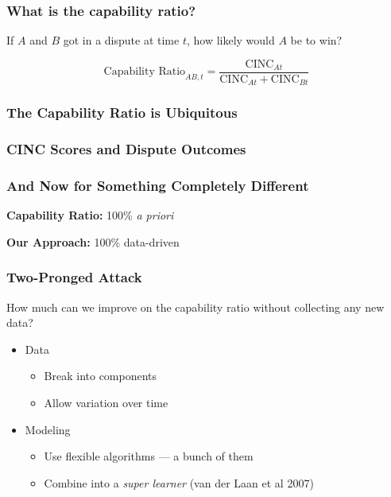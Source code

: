 \documentclass[10pt]{beamer}
\begin{document}
\begin{frame}
  \frametitle{What is the capability ratio?}

  If $A$ and $B$ got in a dispute at time $t$, how likely would $A$ be to win?

  \begin{displaymath}
    \text{Capability Ratio}_{AB,t}
    =
    \frac{\text{CINC}_{At}}{\text{CINC}_{At} + \text{CINC}_{Bt}}
  \end{displaymath}
\end{frame}

\begin{frame}
  \frametitle{The Capability Ratio is Ubiquitous}

  \scriptsize
  
\end{frame}

\begin{frame}
  \frametitle{CINC Scores and Dispute Outcomes}

  \centering
  \only<2>{}%
  \only<4>{}%
  \only<6>{}%
\end{frame}


\begin{frame}
  \frametitle{And Now for Something Completely Different}

  \textbf{Capability Ratio:} 100\% \emph{a priori}

  \textbf{Our Approach:} 100\% data-driven
\end{frame}

\begin{frame}
  \frametitle{Two-Pronged Attack}

  How much can we improve on the capability ratio without collecting any new data?

  \begin{itemize}
    \item Data
    \begin{itemize}
      \item Break into components
      \item Allow variation over time
    \end{itemize}

    \item Modeling
    \begin{itemize}
      \item Use flexible algorithms --- a bunch of them
      \item Combine into a \emph{super learner} (van der Laan et al 2007)
    \end{itemize}
  \end{itemize}
\end{frame}
\end{document}
